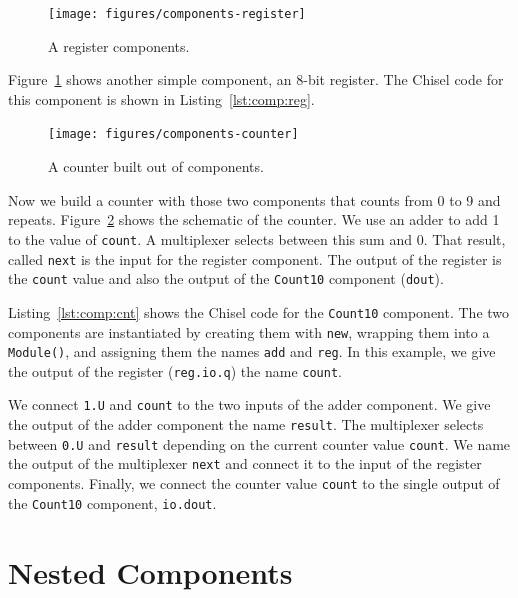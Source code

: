 \documentclass[%
    10pt,
    headinclude, footexclude,
    openright, %
    notitlepage,
    cleardoubleempty,
    headsepline,
    pointlessnumbers,
    bibtotoc, idxtotoc,
    ]{scrbook}
\newcommand{\code}[1]{{\lstinline[basicstyle=\small\ttfamily]{#1}}}
\begin{document}
\begin{figure}
  \centering
  \texttt{[image: figures/components-register]}
  \caption{A register components.}
  \label{fig:components-register}
\end{figure}


Figure~\ref{fig:components-register} shows another simple component, an 8-bit register.
The Chisel code for this component is shown in Listing~\ref{lst:comp:reg}.


\begin{figure}
  \centering
  \texttt{[image: figures/components-counter]}
  \caption{A counter built out of components.}
  \label{fig:components-counter}
\end{figure}


Now we build a counter with those two components that counts from 0 to 9 and repeats.
Figure~\ref{fig:components-counter} shows the schematic of the counter. We use an adder
to add 1 to the value of \code{count}. A multiplexer selects between this sum and 0.
That result, called \code{next} is the input for the register component. The output of the
register is the \code{count} value and also the output of the \code{Count10} component (\code{dout}).

Listing~\ref{lst:comp:cnt} shows the Chisel code for the \code{Count10} component.
The two components are instantiated by creating them with \code{new}, wrapping them
into a \code{Module()}, and assigning them the names \code{add} and \code{reg}.
In this example, we give the output of the register (\code{reg.io.q}) the name \code{count}.

We connect \code{1.U} and \code{count} to the two inputs of the adder component.
We give the output of the adder component the name \code{result}.
The multiplexer selects between \code{0.U} and \code{result} depending on the current counter
value \code{count}. We name the output of the multiplexer \code{next} and connect it
to the input of the register components. Finally, we connect the counter value \code{count}
to the single output of the \code{Count10} component, \code{io.dout}.



\section{Nested Components}
\end{document}
